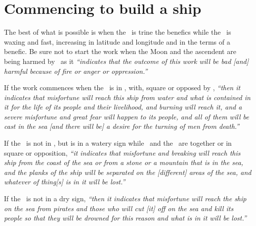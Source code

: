\section{Commencing to build a ship}
The best of what is possible is when the \Sun\, is trine the benefics while the \Moon\, is waxing and fast, increasing in latitude and longitude and in the terms of a benefic.  Be sure not to start the work when the Moon and the ascendent are being harmed by \Mars\, as it \textsl{``indicates that the outcome of this work will be  bad [and] harmful because of fire or anger or oppression.''}

If the work commences when the \Moon\, is in \Aquarius, with, square or opposed by \Mars, \textsl{``then it indicates that misfortune will reach this ship from water and what is contained in it for the life of its people and their livelihood, and burning will reach it, and a severe misfortune and great  fear will happen to its people, and all of them will be cast in the sea [and there will be] a desire for the turning of men from death.''}

If the \Moon\, is not in \Aquarius, but is in a watery sign while \Mars\, and the \Sun\, are together or in square or opposition, \textsl{``it indicates that misfortune and breaking will reach this ship from the coast of the sea or from a stone or a mountain that is in the sea, and the planks of the ship will be separated on the [different] areas of the sea, and whatever of thing[s] is in it will be lost.''}

If the \Moon\, is not in a dry sign, \textsl{``then it indicates that misfortune will reach the ship on the sea from pirates and those who will cut [it] off on the sea and kill its people so that they will be drowned for this reason and what is in it will be lost.''}




